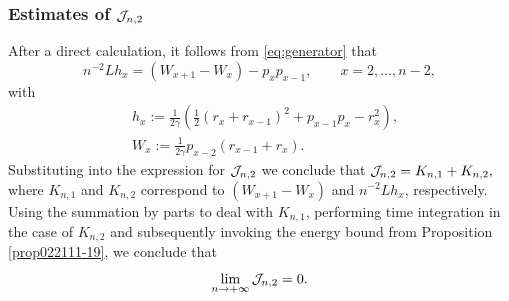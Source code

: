 \documentclass[EJP]{ejpecp} %
\newcommand \ga{\gamma}
\renewcommand{\tilde}{\widetilde}
\renewcommand{\bar}{\overline}
\numberwithin{equation}{section}
\begin{document}
\subsubsection{Estimates of ${\cal J}_{n,2}$}






After a direct calculation, it follows from \eqref{eq:generator} that
\begin{equation}
\label{033108-19}
n^{-2} L h_x = (W_{x+1}-W_x)- p_x p_{x-1},\qquad x=2,\ldots,n-2,
\end{equation}
with
\begin{align*}
&h_x:=\frac{1}{2\ga}
\left(\frac12(r_x +r_{x-1})^2 +p_{x-1}p_{x} -r_x^2\right),\\
&
W_x:=\frac{1}{2\ga}p_{x-2}(r_{x-1}+r_x).
\end{align*}
Substituting into the expression for ${\cal J}_{n,2}$ we conclude that $
  {\cal J}_{n,2}=K_{n,1}+K_{n,2},$
where $K_{n,1}$ and $K_{n,2}$ correspond to $(W_{x+1}-W_x)$ and $n^{-2}Lh_x$,
respectively.
Using the summation by parts to deal with $K_{n,1}$,
performing time integration in the case of  $K_{n,2}$ and subsequently 
invoking the energy bound from Proposition \ref{prop022111-19}, we conclude that
\begin{equation}
\label{050301-20}
\lim_{n\to+\infty}{\cal J}_{n,2}=0.
\end{equation}


\medskip
\end{document}
